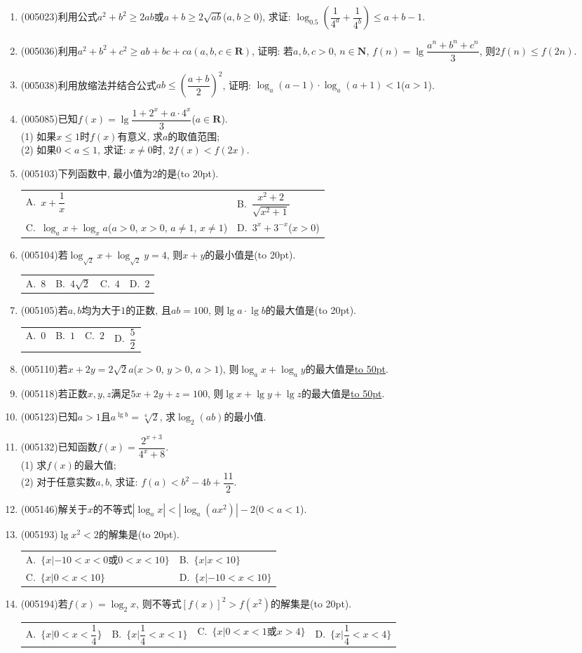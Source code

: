 \documentclass[10pt,a4paper]{article}
\newcommand{\blank}[1]{\underline{\hbox to #1pt{}}}
\newcommand{\bracket}[1]{(\hbox to #1pt{})}
\newcommand{\twoch}[4]{\par\begin{tabular}{p{.46\textwidth}p{.46\textwidth}}
A.~#1& B.~#2\\
C.~#3& D.~#4
\end{tabular}}
\newcommand{\fourch}[4]{\par\begin{tabular}{p{.23\textwidth}p{.23\textwidth}p{.23\textwidth}p{.23\textwidth}}
A.~#1 &B.~#2& C.~#3& D.~#4
\end{tabular}}
\begin{document}
\begin{enumerate}[1.]
\item {\tiny (005023)}利用公式$a^2+b^2\ge 2ab$或$a+b\ge 2\sqrt{ab}$($a,b\ge 0$), 求证: $\log_{0.5}(\dfrac 1{4^a}+\dfrac 1{4^b})\le a+b-1$.
\item {\tiny (005036)}利用$a^2+b^2+c^2\ge ab+bc+ca(a,b,c\in \mathbf{R})$, 证明: 若$a,b,c>0$, $n\in \mathbf{N}$, $f(n)=\lg \dfrac{a^n+b^n+c^n}3$, 则$2f(n)\le f(2n)$.
\item {\tiny (005038)}利用放缩法并结合公式$ab\le (\dfrac{a+b}2)^2$, 证明: $\log_a(a-1)\cdot \log_a(a+1)<1$($a>1$).
\item {\tiny (005085)}已知$f(x)=\lg \dfrac{1+2^x+a\cdot 4^x}3$($a\in \mathbf{R}$).\\
(1) 如果$x\le 1$时$f(x)$有意义, 求$a$的取值范围;\\
(2) 如果$0<a\le 1$, 求证: $x\ne 0$时, $2f(x)<f(2x)$.
\item {\tiny (005103)}下列函数中, 最小值为$2$的是\bracket{20}.
\twoch{$x+\dfrac 1x$}{$\dfrac{x^2+2}{\sqrt{x^2+1}}$}{$\log_ax+\log_xa$($a>0$, $x>0$, $a\ne 1$, $x\ne 1$)}{$3^x+3^{-x}$($x>0$)}
\item {\tiny (005104)}若$\log_{\sqrt 2}x+\log_{\sqrt 2}y=4$, 则$x+y$的最小值是\bracket{20}.
\fourch{$8$}{$4\sqrt 2$}{$4$}{$2$}
\item {\tiny (005105)}若$a,b$均为大于$1$的正数, 且$ab=100$, 则$\lg a\cdot \lg b$的最大值是\bracket{20}.
\fourch{$0$}{$1$}{$2$}{$\dfrac 52$}
\item {\tiny (005110)}若$x+2y=2\sqrt 2a$($x>0$, $y>0$, $a>1$), 则$\log_ax+\log_ay$的最大值是\blank{50}.
\item {\tiny (005118)}若正数$x,y,z$满足$5x+2y+z=100$, 则$\lg x+\lg y+\lg z$的最大值是\blank{50}.
\item {\tiny (005123)}已知$a>1$且$a^{\lg b}=\sqrt[4]2$, 求$\log_2(ab)$的最小值.
\item {\tiny (005132)}已知函数$f(x)=\dfrac{2^{x+3}}{{4^x}+8}$.\\
(1) 求$f(x)$的最大值;\\
(2) 对于任意实数$a,b$, 求证: $f(a)<b^2-4b+\dfrac{11}2$.
\item {\tiny (005146)}解关于$x$的不等式$|\log_ax|<|\log_a(ax^2)|-2$($0<a<1$).
\item {\tiny (005193)}$\lg x^2<2$的解集是\bracket{20}.
\twoch{$\{x|-10<x<0\text{或}0<x<10\}$}{$\{x|x<10\}$}{$\{x|0<x<10\}$}{$\{x|-10<x<10\}$}
\item {\tiny (005194)}若$f(x)=\log_2x$, 则不等式$[f(x)]^2>f(x^2)$的解集是\bracket{20}.
\fourch{$\{x|0<x<\dfrac 14\}$}{$\{x|\dfrac 14<x<1\}$}{$\{x|0<x<1\text{或}x>4\}$}{$\{x|\dfrac 14<x<4\}$}

\end{enumerate}
\end{document}
